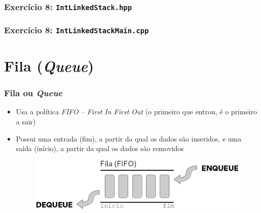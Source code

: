 \documentclass[aspectratio=169]{beamer}
\begin{document}
\begin{frame}[fragile]\frametitle{Exercício 8: \texttt{IntLinkedStack.hpp}}

\end{frame}

\begin{frame}[fragile]\frametitle{Exercício 8: \texttt{IntLinkedStackMain.cpp}}
\fontsize{6pt}{6pt}\selectfont{

}
\end{frame}

\section{Fila (\emph{Queue})}

\begin{frame}\frametitle{Fila ou \emph{Queue}}
\begin{itemize}
	\item Usa a política \emph{FIFO -- First In First Out} (o primeiro que entrou, é o primeiro a sair)
	\item Possui uma entrada (fim), a partir da qual os dados são inseridos, e uma saída (início), a partir da qual os dados são removidos
\begin{figure}[h]
	\centering
	\includegraphics[height=0.3\paperheight]{imagens/fila.png}
\end{figure}
\end{itemize}
\end{frame}
\end{document}
